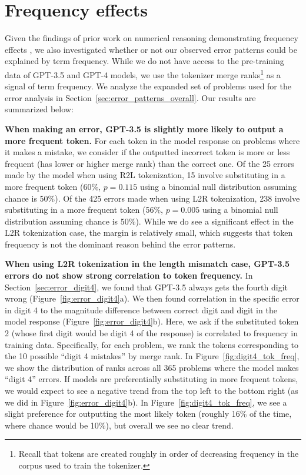 \documentclass{article}
\theoremstyle{plain}
\theoremstyle{definition}
\theoremstyle{remark}
\begin{document}
\section{Frequency effects}
\label{appx:frequency}

Given the findings of prior work on numerical reasoning demonstrating frequency effects \cite{razeghi2022frequencies}, we also investigated whether or not our observed error patterns could be explained by term frequency. While we do not have access to the pre-training data of GPT-3.5 and GPT-4 models, we use the tokenizer merge ranks\footnote{Recall that tokens are created roughly in order of decreasing frequency in the corpus used to train the tokenizer.} as a signal of term frequency. We analyze the expanded set of problems used for the error analysis in Section~\ref{sec:error_patterns_overall}. Our results are summarized below:

\textbf{When making an error, GPT-3.5 is slightly more likely to output a more frequent token.} For each token in the model response on problems where it makes a mistake, we consider if the outputted incorrect token is more or less frequent (has lower or higher merge rank) than the correct one. Of the 25 errors made by the model when using R2L tokenization, 15 involve substituting in a more frequent token (60\%, $p=0.115$ using a binomial null distribution assuming chance is 50\%). Of the 425 errors made when using L2R tokenization, 238 involve substituting in a more frequent token (56\%, $p=0.005$ using a binomial null distribution assuming chance is 50\%). While we do see a significant effect in the L2R tokenization case, the margin is relatively small, which suggests that token frequency is not the dominant reason behind the error patterns.

\textbf{When using L2R tokenization in the length mismatch case, GPT-3.5 errors do not show strong correlation to token frequency.} In Section~\ref{sec:error_digit4}, we found that GPT-3.5 always gets the fourth digit wrong (Figure~\ref{fig:error_digit4}a). We then found correlation in the specific error in digit 4 to the magnitude difference between correct digit and digit in the model response (Figure~\ref{fig:error_digit4}b). Here, we ask if the substituted token 2 (whose first digit would be digit 4 of the response) is correlated to frequency in training data. Specifically, for each problem, we rank the tokens corresponding to the 10 possible ``digit 4 mistakes'' by merge rank. In Figure~\ref{fig:digit4_tok_freq}, we show the distribution of ranks across all 365 problems where the model makes ``digit 4'' errors. If models are preferentially substituting in more frequent tokens, we would expect to see a negative trend from the top left to the bottom right (as we did in  Figure~\ref{fig:error_digit4}b). In Figure~\ref{fig:digit4_tok_freq}, we see a slight preference for outputting the most likely token (roughly 16\% of the time, where chance would be 10\%), but overall we see no clear trend.
\end{document}
